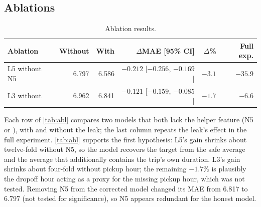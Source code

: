 \documentclass[11pt,a4paper]{article}
\newcommand{\ft}[1]{\texttt{\detokenize{#1}}}
\begin{document}
\subsection{Ablations}
\begin{table}[H]
\centering\small
\caption{Ablation results.}
\label{tab:abl}
\begin{tabular}{@{}l r r r r r@{}}
\toprule
Ablation & Without & With & $\Delta$MAE [95\% CI] & $\Delta$\% & Full exp. \\
\midrule
L5 without N5 & 6.797 & 6.586 & $-0.212$ [$-0.256$, $-0.169$] & $-3.1$ & $-35.9$ \\
L3 without \ft{pickup_hour} & 6.962 & 6.841 & $-0.121$ [$-0.159$, $-0.085$] & $-1.7$ & $-6.6$ \\
\bottomrule
\end{tabular}
\end{table}

Each row of \autoref{tab:abl} compares two models that both lack the helper feature (N5 or \ft{pickup_hour}), with and without the leak; the last column repeats the leak's effect in the full experiment. \autoref{tab:abl} supports the first hypothesis: L5's gain shrinks about twelve-fold without N5, so the model recovers the target from the safe average and the average that additionally contains the trip's own duration. L3's gain shrinks about four-fold without pickup hour; the remaining $-1.7\%$ is plausibly the dropoff hour acting as a proxy for the missing pickup hour, which was not tested. Removing N5 from the corrected model changed its MAE from 6.817 to 6.797 (not tested for significance), so N5 appears redundant for the honest model.
\end{document}
